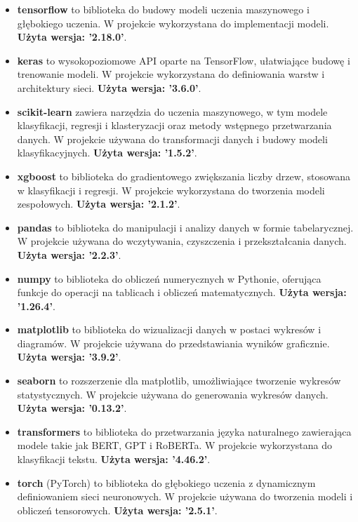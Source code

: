 \begin{itemize}
	\item \textbf{tensorflow} to biblioteka do budowy modeli uczenia maszynowego i głębokiego uczenia. W projekcie wykorzystana do implementacji modeli. \textbf{Użyta wersja: '2.18.0'}.
	\item \textbf{keras} to wysokopoziomowe API oparte na TensorFlow, ułatwiające budowę i trenowanie modeli. W projekcie wykorzystana do definiowania warstw i architektury sieci. \textbf{Użyta wersja: '3.6.0'}.
	\item \textbf{scikit-learn} zawiera narzędzia do uczenia maszynowego, w tym modele klasyfikacji, regresji i klasteryzacji oraz metody wstępnego przetwarzania danych. W projekcie używana do transformacji danych i budowy modeli klasyfikacyjnych. \textbf{Użyta wersja: '1.5.2'}.
	\item \textbf{xgboost} to biblioteka do gradientowego zwiększania liczby drzew, stosowana w klasyfikacji i regresji. W projekcie wykorzystana do tworzenia modeli zespołowych. \textbf{Użyta wersja: '2.1.2'}.
	\item \textbf{pandas} to biblioteka do manipulacji i analizy danych w formie tabelarycznej. W projekcie używana do wczytywania, czyszczenia i przekształcania danych. \textbf{Użyta wersja: '2.2.3'}.
	\item \textbf{numpy} to biblioteka do obliczeń numerycznych w Pythonie, oferująca funkcje do operacji na tablicach i obliczeń matematycznych. \textbf{Użyta wersja: '1.26.4'}.
	\item \textbf{matplotlib} to biblioteka do wizualizacji danych w postaci wykresów i diagramów. W projekcie używana do przedstawiania wyników graficznie. \textbf{Użyta wersja: '3.9.2'}.
	\item \textbf{seaborn} to rozszerzenie dla matplotlib, umożliwiające tworzenie wykresów statystycznych. W projekcie używana do generowania wykresów danych. \textbf{Użyta wersja: '0.13.2'}.
	\item \textbf{transformers} to biblioteka do przetwarzania języka naturalnego zawierająca modele takie jak BERT, GPT i RoBERTa. W projekcie wykorzystana do klasyfikacji tekstu. \textbf{Użyta wersja: '4.46.2'}.
	\item \textbf{torch} (PyTorch) to biblioteka do głębokiego uczenia z dynamicznym definiowaniem sieci neuronowych. W projekcie używana do tworzenia modeli i obliczeń tensorowych. \textbf{Użyta wersja: '2.5.1'}.
\end{itemize}

